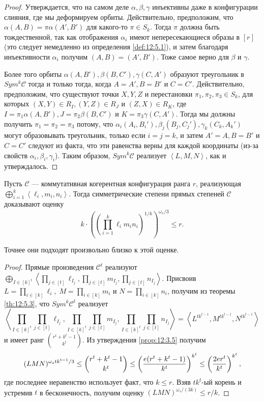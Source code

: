 \begin{proof}
 Утверждается, что на самом деле $\alpha,\beta,\gamma$ инъективны даже в конфигурации слияния, где мы деформируем орбиты. Действительно, предположим, что $\alpha(A,B)=\pi \alpha(A',B')$ для какого-то $\pi \in S_k$. Тогда $\pi$ должна быть тождественной, так как отображения $\alpha_i$ имеют непересекающиеся образы в $[r]$ (это следует немедленно из определения \ref{def:12:5.1}), и затем благодаря инъективности $\alpha_i$ получим $(A,B)=(A',B')$. Тоже самое верно для $\beta$ и $\gamma$.
 
Более того орбиты $\alpha(A,B'), \beta(B,C'), \gamma(C,A')$ образуют треугольник в $Sym^k \mathscr{C}$ тогда и только тогда, когда $A=A',B=B'$ и $C=C'$. Действительно, предположим, что существуют точки $X,Y,Z$ и перестановки $\pi_1,\pi_2,\pi_3 \in S_k$, для которых $(X,Y) \in R_I, (Y,Z) \in R_J$ и $(Z,X) \in R_K$, где $I=\pi_1 \alpha(A,B'),J=\pi_2 \beta(B,C')$ и $K=\pi_3 \gamma(C,A')$. Тогда мы должны получить $\pi_1=\pi_2=\pi_3$ потому, что $\alpha_i(A_i,B_i'), \beta_j(B_j,C_j'), \gamma_k(C_k,A_k')$ могут образовывать треугольник, только если $i=j=k$, и затем $A'=A,B=B'$ и $C=C'$ следуют из факта, что эти равенства верны для каждой координаты (из-за свойств $\alpha_i,\beta_i,\gamma_i$). Таким образом, $Sym^k \mathscr{C}$ реализует $\left\langle L,M,N \right\rangle$, как и утверждалось.
\end{proof}

\begin{corollary}\label{cor:12:5.4}
  Пусть $\mathscr{C}$ --- коммутативная когерентная конфигурация ранга $r$, реализующая $\bigoplus_{i=1}^k \left\langle \ell_i, m_i, n_i  \right\rangle$. Тогда симметрические степени прямых степеней $\mathscr{C}$ доказывают оценку
  \[
  	k \cdot \left( \left( \prod_{i=1}^k \ell_i m_i n_i \right)^{1/k} \right)^{\omega_s/3} \leq r.
  \]
\end{corollary}
Точнее они подходят произвольно близко к этой оценке.
\begin{proof}
  Прямые произведения $\mathscr{C}^t$ реализуют $\bigoplus_{I \in [k]^t} \left\langle \prod_{j \in [t]} \ell_{I_j}, \prod_{j \in [t]} m_{I_j}, \prod_{j \in [t]} n_{I_j}  \right\rangle$. Присвоив $L =\prod_{i \in [k]} \ell_i,\; M = \prod_{i \in [k]} m_i$ и $N = \prod_{i \in [k]} n_i$, получим из теоремы \ref{th:12:5.3}, что $Sym^k \mathscr{C}^t$ реализует 
  \[
  	\left\langle 
  		\prod_{I \in [k]^t} \prod_{j \in [t]} \ell_{I_j},  
  		\prod_{I \in [k]^t} \prod_{j \in [t]} m_{I_j},
  		\prod_{I \in [k]^t} \prod_{j \in [t]} n_{I_j}
  	\right\rangle = \left\langle L^{t k^{t-1}}, M^{t k^{t-1}}, N^{t k^{t-1}} \right\rangle
  \]
  и имеет ранг $\binom{r^t+k^t-1}{k^t}$. Из утверждения \ref{prop:12:3.5} получим
  \[
  	(LMN)^{\omega_s t k^{t-1}/3} \leq \dbinom{r^t+k^t-1}{k^t} \leq \left( \frac{e (r^t+k^t-1)}{k^t} \right)^{k^t} \leq \left( \frac{2 e r^t}{k^t} \right)^{k^t},
  \]
  где последнее неравенство использует факт, что $k \leq r$. Взяв $t k^t$-ый корень и устремив $t$ в бесконечность, получим оценку $(LMN)^{\omega_s/(3k)} \leq r/k$.  
\end{proof}

